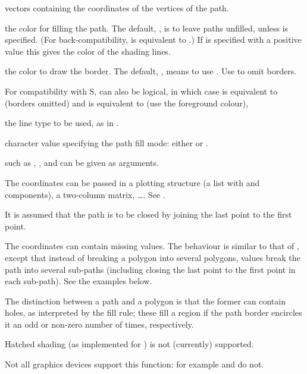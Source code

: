 \begin{Arguments}
\begin{ldescription}
\item[\code{x,y}] vectors containing the coordinates of the vertices
of the path.
\item[\code{col}] the color for filling the path. The default,
, is to leave paths unfilled, unless  is
specified.  (For back-compatibility,  is equivalent to
.)  If  is specified with a positive value
this gives the color of the shading lines.
\item[\code{border}] the color to draw the border.  The default, ,
means to use .  Use  to
omit borders.

For compatibility with S,  can also be logical, in
which case  is equivalent to  (borders omitted)
and  is equivalent to  (use the foreground colour),

\item[\code{lty}] the line type to be used, as in .
\item[\code{rule}] character value specifying the path fill mode: either
 or .
\item[\code{...}]  such as , ,
 and  can be given as arguments.
\end{ldescription}
\end{Arguments}
%
\begin{Details}\relax
The coordinates can be passed in a plotting structure
(a list with  and  components), a two-column matrix,
\dots.  See .

It is assumed that the path is to be closed by joining the last point to
the first point.

The coordinates can contain missing values.  The behaviour is similar
to that of , except that instead of breaking a
polygon into several polygons,  values break the path into
several sub-paths (including closing the last point to the first point
in each sub-path).  See the examples below.

The distinction between a path and a polygon is that the former
can contain holes, as interpreted by the fill rule; these fill a region if
the path border encircles it an odd or non-zero number of times,
respectively.

Hatched shading (as implemented for ) is not
(currently) supported.

Not all graphics devices support this function: for example
 and  do not.
\end{Details}

